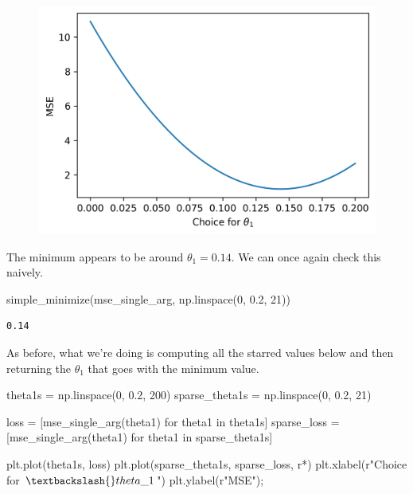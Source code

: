\documentclass[
  letterpaper,
  DIV=11,
  numbers=noendperiod]{scrreprt}
\newenvironment{Shaded}{\begin{snugshade}}{\end{snugshade}}
\newcommand{\ControlFlowTok}[1]{\textcolor[rgb]{0.00,0.23,0.31}{#1}}
\newcommand{\DecValTok}[1]{\textcolor[rgb]{0.68,0.00,0.00}{#1}}
\newcommand{\FloatTok}[1]{\textcolor[rgb]{0.68,0.00,0.00}{#1}}
\newcommand{\KeywordTok}[1]{\textcolor[rgb]{0.00,0.23,0.31}{#1}}
\newcommand{\NormalTok}[1]{\textcolor[rgb]{0.00,0.23,0.31}{#1}}
\newcommand{\OperatorTok}[1]{\textcolor[rgb]{0.37,0.37,0.37}{#1}}
\newcommand{\StringTok}[1]{\textcolor[rgb]{0.13,0.47,0.30}{#1}}
\newcommand{\VerbatimStringTok}[1]{\textcolor[rgb]{0.13,0.47,0.30}{#1}}
\begin{document}
\begin{figure}[H]

{\centering \includegraphics{gradient_descent/gradient_descent_files/figure-pdf/cell-27-output-1.png}

}

\end{figure}

The minimum appears to be around \(\theta_1 = 0.14\). We can once again
check this naively.

\begin{Shaded}
\begin{Highlighting}[]
\NormalTok{simple\_minimize(mse\_single\_arg, np.linspace(}\DecValTok{0}\NormalTok{, }\FloatTok{0.2}\NormalTok{, }\DecValTok{21}\NormalTok{))}
\end{Highlighting}
\end{Shaded}

\begin{verbatim}
0.14
\end{verbatim}

As before, what we're doing is computing all the starred values below
and then returning the \(\theta_1\) that goes with the minimum value.

\begin{Shaded}
\begin{Highlighting}[]
\NormalTok{theta1s }\OperatorTok{=}\NormalTok{ np.linspace(}\DecValTok{0}\NormalTok{, }\FloatTok{0.2}\NormalTok{, }\DecValTok{200}\NormalTok{)}
\NormalTok{sparse\_theta1s }\OperatorTok{=}\NormalTok{ np.linspace(}\DecValTok{0}\NormalTok{, }\FloatTok{0.2}\NormalTok{, }\DecValTok{21}\NormalTok{)}

\NormalTok{loss }\OperatorTok{=}\NormalTok{ [mse\_single\_arg(theta1) }\ControlFlowTok{for}\NormalTok{ theta1 }\KeywordTok{in}\NormalTok{ theta1s]}
\NormalTok{sparse\_loss }\OperatorTok{=}\NormalTok{ [mse\_single\_arg(theta1) }\ControlFlowTok{for}\NormalTok{ theta1 }\KeywordTok{in}\NormalTok{ sparse\_theta1s]}

\NormalTok{plt.plot(theta1s, loss)}
\NormalTok{plt.plot(sparse\_theta1s, sparse\_loss, }\StringTok{\textquotesingle{}r*\textquotesingle{}}\NormalTok{)}
\NormalTok{plt.xlabel(}\VerbatimStringTok{r"Choice for $\textbackslash{}theta\_1$"}\NormalTok{)}
\NormalTok{plt.ylabel(}\VerbatimStringTok{r"MSE"}\NormalTok{)}\OperatorTok{;}
\end{Highlighting}
\end{Shaded}
\end{document}
